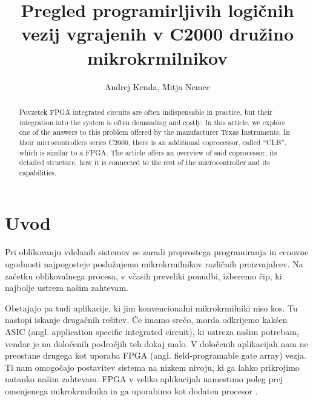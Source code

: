 \documentclass[a4paper]{article}
\begin{document}
\begin{sloppypar}
\title{Pregled programirljivih logičnih vezij vgrajenih v C2000 družino mikrokrmilnikov}

\author{Andrej Kenda, Mitja Nemec}
% 


\maketitle



\begin{abstract}{Povzetek}
FPGA integrated circuits are often indispensable in practice, but their
integration into the system is often demanding and costly. In this article, we
explore one of the answers to this problem offered by the manufacturer Texas
Instruments. In their microcontrollers series C2000, there is an additional coprocessor,
called ``CLB'', which is similar to a FPGA. The article offers an overview of
said coprocessor, its detailed structure, how it is connected to the rest of
the microcontroller and its capabilities.
\end{abstract}




\section{Uvod}
Pri oblikovanju vdelanih sistemov se zaradi preprostega programiranja in
cenovne ugodnosti najpogosteje poslužujemo mikrokrmilnikov različnih
proizvajalcev. Na začetku oblikovalnega procesa, v včasih preveliki ponudbi,
izberemo čip, ki najbolje ustreza našim zahtevam.

Obstajajo pa tudi aplikacije, ki jim konvencionalni mikrokrmilniki niso kos. Tu
nastopi iskanje drugačnih rešitev. Če imamo srečo, morda odkrijemo kakšen ASIC
(angl. application specific integrated circuit), ki ustreza našim potrebam,
vendar je na določenih področjih teh dokaj malo. V določenih aplikacijah nam ne
preostane drugega kot uporaba FPGA (angl. field-programable gate array) vezja.
Ti nam omogočajo postavitev sistema na nizkem nivoju, ki ga lahko prikrojimo
natanko našim zahtevam. FPGA v veliko aplikacijah namestimo poleg prej
omenjenega mikrokrmilnika in ga uporabimo kot dodaten procesor
\cite{chen-fpga-automation}.


\end{sloppypar}
\end{document}
